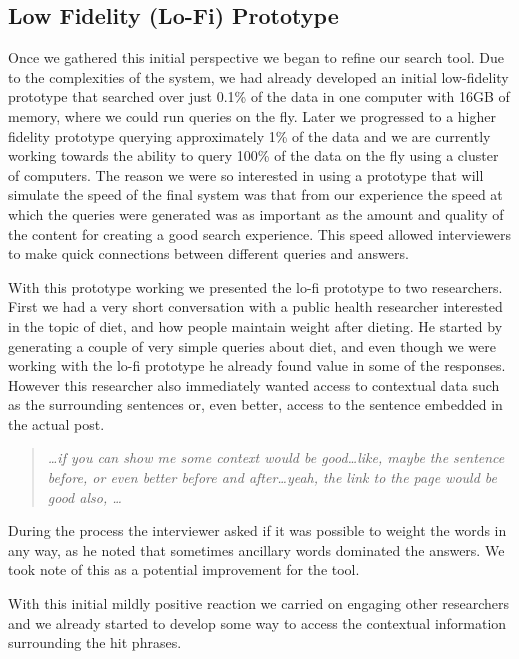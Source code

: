 \documentclass{sigchi}
\begin{document}
\subsection{Low Fidelity (Lo-Fi) Prototype}
Once we gathered this initial perspective we began to refine our search tool. Due to the complexities of the system, we had already developed an initial low-fidelity prototype that searched over just 0.1\% of the data in one computer with 16GB of memory, where we could run queries on the fly. Later we progressed to a higher fidelity prototype querying approximately 1\% of the data and we are currently working towards the ability to query 100\% of the data on the fly using a cluster of computers. The reason we were so interested in using a prototype that will simulate the speed of the final system was that from our experience the speed at which the queries were generated was as important as the amount and quality of the content for creating a good search experience. This speed allowed interviewers to make quick connections between different queries and answers.

With this prototype working we presented the lo-fi prototype to two researchers. First we had a very short conversation with a public health researcher interested in the topic of diet, and how people maintain weight after dieting. He started by generating a couple of very simple queries about diet, and even though we were working with the lo-fi prototype he already found value in some of the responses. However this researcher also immediately wanted access to contextual data such as the surrounding sentences or, even better, access to the sentence embedded in the actual post. 

\begin{quote}
{\em
\dots if you can show me some context would be good\dots like, maybe the sentence before, or even better before and after\dots yeah, the link to the page would be good also, \dots
}\end{quote}


During the process the interviewer asked if it was possible to weight the words in any way, as he noted that sometimes ancillary words dominated the answers. We took note of this as a potential improvement for the tool.

With this initial mildly positive reaction we carried on engaging other researchers and we already started to develop some way to access the contextual information surrounding the hit phrases. 

\end{document}
